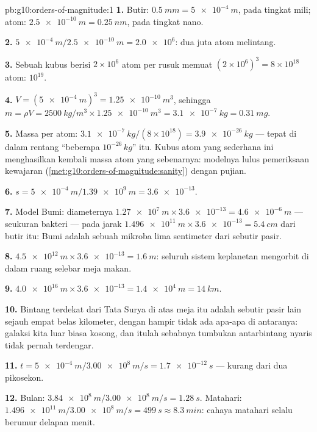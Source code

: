 \begin{solution}{pb:g10:orders-of-magnitude:1}
\textbf{1.} Butir: $\qty{0.5}{mm} = \qty{5e-4}{m}$, pada tingkat mili;
atom: $\qty{2.5e-10}{m} = \qty{0.25}{nm}$, pada tingkat nano.

\textbf{2.} $\qty{5e-4}{m}/\qty{2.5e-10}{m} = \num{2.0e6}$: dua juta
atom melintang.

\textbf{3.} Sebuah kubus berisi $2 \times 10^{6}$ atom per rusuk
memuat $(2\times10^{6})^{3} = 8 \times 10^{18}$ atom: 
$10^{19}$.

\textbf{4.} $V = (\qty{5e-4}{m})^{3} = \qty{1.25e-10}{m^3}$, sehingga
$m = \rho V = \qty{2500}{kg/m^3} \times \qty{1.25e-10}{m^3}
= \qty{3.1e-7}{kg} = \qty{0.31}{mg}$.

\textbf{5.} Massa per atom:
$\qty{3.1e-7}{kg}/(8\times10^{18}) = \qty{3.9e-26}{kg}$ --- tepat di
dalam rentang ``beberapa $10^{-26}\,\unit{kg}$'' itu. Kubus atom yang
sederhana ini menghasilkan kembali massa atom yang sebenarnya:
modelnya lulus pemeriksaan kewajaran
(\cref{met:g10:orders-of-magnitude:sanity}) dengan pujian.

\textbf{6.} $s = \qty{5e-4}{m}/\qty{1.39e9}{m} = \num{3.6e-13}$.

\textbf{7.} Model Bumi: diameternya
$\qty{1.27e7}{m} \times \num{3.6e-13} = \qty{4.6e-6}{m}$ --- seukuran
bakteri --- pada jarak
$\qty{1.496e11}{m} \times \num{3.6e-13} = \qty{5.4}{cm}$ dari butir
itu: Bumi adalah sebuah mikroba lima sentimeter dari sebutir pasir.

\textbf{8.} $\qty{4.5e12}{m} \times \num{3.6e-13} = \qty{1.6}{m}$:
seluruh sistem keplanetan mengorbit di dalam ruang selebar meja makan.

\textbf{9.} $\qty{4.0e16}{m} \times \num{3.6e-13} = \qty{1.4e4}{m}
= \qty{14}{km}$.

\textbf{10.} Bintang terdekat dari Tata Surya di atas meja itu adalah
sebutir pasir lain sejauh empat belas kilometer, dengan hampir tidak
ada apa-apa di antaranya: galaksi kita luar biasa kosong, dan itulah
sebabnya tumbukan antarbintang nyaris tidak pernah terdengar.

\textbf{11.} $t = \qty{5e-4}{m}/\qty{3.00e8}{m/s} = \qty{1.7e-12}{s}$
--- kurang dari dua pikosekon.

\textbf{12.} Bulan: $\qty{3.84e8}{m}/\qty{3.00e8}{m/s} =
\qty{1.28}{s}$. Matahari: $\qty{1.496e11}{m}/\qty{3.00e8}{m/s} =
\qty{499}{s} \approx \qty{8.3}{min}$: cahaya matahari selalu berumur
delapan menit.


\end{solution}
